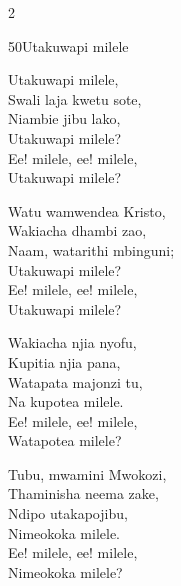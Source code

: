\documentclass{article}
\begin{document}
\begin{multicols}{2}
\begin{hymn}{50}{Utakuwapi milele}{}
\begin{stanza}
Utakuwapi milele,\\
Swali laja kwetu sote,\\
Niambie jibu lako,\\
Utakuwapi milele?\\
Ee! milele, ee! milele,\\
Utakuwapi milele?
\end{stanza}
\begin{stanza}
Watu wamwendea Kristo,\\
Wakiacha dhambi zao,\\
Naam, watarithi mbinguni;\\
Utakuwapi milele?\\
Ee! milele, ee! milele,\\
Utakuwapi milele?
\end{stanza}
\begin{stanza}
Wakiacha njia nyofu,\\
Kupitia njia pana,\\
Watapata majonzi tu,\\
Na kupotea milele.\\
Ee! milele, ee! milele,\\
Watapotea milele?
\end{stanza}
\begin{stanza}
Tubu, mwamini Mwokozi,\\
Thaminisha neema zake,\\
Ndipo utakapojibu,\\
Nimeokoka milele.\\
Ee! milele, ee! milele,\\
Nimeokoka milele?
\end{stanza}
\end{hymn}


\end{multicols}
\end{document}
